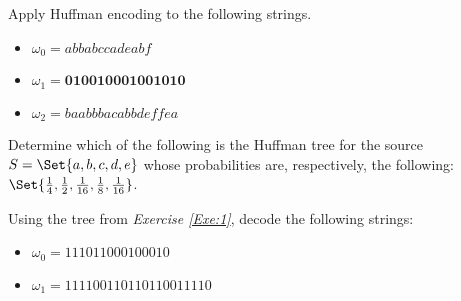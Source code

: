 \documentclass{subfiles}
\begin{document}
    \begin{exercise}
        Apply Huffman encoding to the following strings.
        \begin{itemize}
            \item \(\omega_{0} = abbabccadeabf\)
            \item \(\omega_{1} = \textbf{010010001001010}\)
            \item \(\omega_{2} = baabbbacabbdeffea\)
        \end{itemize}
    \end{exercise}
    \begin{exercise}\label{Exe:1}
        Determine which of the following is the Huffman tree for the source 
            \(S = \Set{a, b, c, d, e}\) whose probabilities are,
        respectively, the following: 
            \(\Set{\tfrac{1}{4}, 
                \tfrac{1}{2},
                \tfrac{1}{16}, 
                \tfrac{1}{8}, 
                \tfrac{1}{16}}\).
        
    \end{exercise}
    \begin{exercise}
        Using the tree from \emph{Exercise \ref{Exe:1}},
        decode the following strings: 
        \begin{itemize}
            \item \(\omega_{0} = 111011000100010\)
            \item \(\omega_{1} = 111100110110110011110\) 
        \end{itemize}
    \end{exercise}
\end{document}
